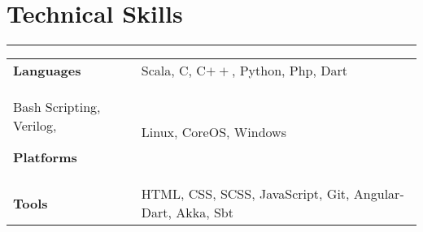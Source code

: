 \documentclass[a4paper]{article}
\begin{document}
  
 \section*{Technical Skills}
 \hrule
 \vspace{3mm}
  \begin{tabular}{@{}m{4.0cm}m{13cm}@{}}
   \textbf{\textrm{Languages}} & 
Scala, C, C$++$, Python, Php, Dart\\
Bash Scripting, Verilog, 
    
  \textbf{\textrm{Platforms}} &
  Linux, CoreOS, Windows\\
  
  \textbf{\textrm{Tools}} &
  HTML, CSS, SCSS, JavaScript, Git, Angular-Dart, Akka, Sbt \\
  \end{tabular}
\end{document}
